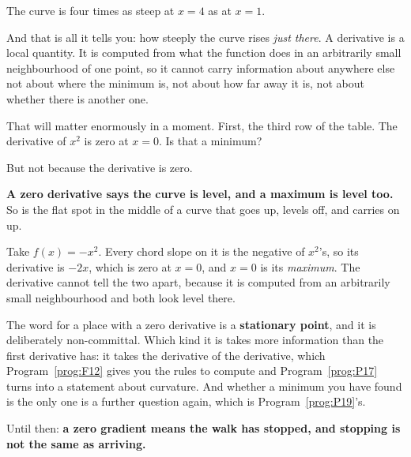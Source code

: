 \begin{fr}
\begin{ansblock}
The curve is four times as steep at $x = 4$ as at $x = 1$.
\end{ansblock}

And that is all it tells you: how steeply the curve rises \emph{just there}. A
derivative is a local quantity. It is computed from what the function does in
an arbitrarily small neighbourhood of one point, so it cannot carry
information about anywhere else \dash{} not about where the minimum is, not
about how far away it is, not about whether there is another one.

That will matter enormously in a moment. First, the third row of the table.
The derivative of $x^{2}$ is zero at $x = 0$. Is that a minimum?
\dotline
\nextframe
\end{fr}

\begin{fr}
But not because the derivative is zero.

\begin{trapbox}
\textbf{A zero derivative says the curve is level, and a maximum is level
too.} So is the flat spot in the middle of a curve that goes up, levels off,
and carries on up.

Take $f(x) = -x^{2}$. Every chord slope on it is the negative of $x^{2}$'s,
so its derivative is $-2x$, which is zero at $x = 0$, and
$x = 0$ is its \emph{maximum}. The derivative cannot tell the two apart,
because it is computed from an arbitrarily small neighbourhood and both look
level there.

The word for a place with a zero derivative is a \textbf{stationary point},
and it is deliberately non-committal. Which kind it is takes more information
than the first derivative has: it takes the derivative of the derivative, which
Program~\ref{prog:F12} gives you the rules to compute and
Program~\ref{prog:P17} turns into a statement about curvature. And whether a
minimum you have found is the only one is a further question again, which is
Program~\ref{prog:P19}'s.

Until then: \textbf{a zero gradient means the walk has stopped, and stopping
is not the same as arriving.}
\end{trapbox}
\end{fr}

